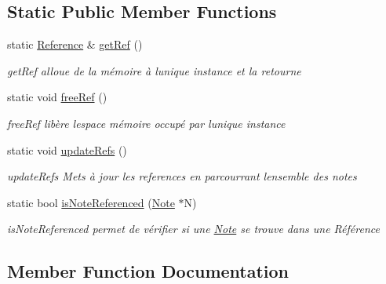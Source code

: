 \subsection*{Static Public Member Functions}
\begin{DoxyCompactItemize}
\item 
static \hyperlink{classReference}{Reference} \& \hyperlink{classReference_a0a885183c4a9c26de166f6e3339786ba}{get\+Ref} ()
\begin{DoxyCompactList}\small\item\em get\+Ref alloue de la mémoire à l\textquotesingle{}unique instance et la retourne \end{DoxyCompactList}\item 
\mbox{\label{classReference_a7544ea6ad6e62ad784d65cddb91d29c3}} 
static void \hyperlink{classReference_a7544ea6ad6e62ad784d65cddb91d29c3}{free\+Ref} ()
\begin{DoxyCompactList}\small\item\em free\+Ref libère l\textquotesingle{}espace mémoire occupé par l\textquotesingle{}unique instance \end{DoxyCompactList}\item 
\mbox{\label{classReference_ae48d8e71f277df20aaa1d6db617b362f}} 
static void \hyperlink{classReference_ae48d8e71f277df20aaa1d6db617b362f}{update\+Refs} ()
\begin{DoxyCompactList}\small\item\em update\+Refs Mets à jour les references en parcourrant l\textquotesingle{}ensemble des notes \end{DoxyCompactList}\item 
static bool \hyperlink{classReference_a591e94c8fc4526305181b563867b85d1}{is\+Note\+Referenced} (\hyperlink{classNote}{Note} $\ast$N)
\begin{DoxyCompactList}\small\item\em is\+Note\+Referenced permet de vérifier si une \hyperlink{classNote}{Note} se trouve dans une Référence \end{DoxyCompactList}\end{DoxyCompactItemize}


\subsection{Member Function Documentation}
\mbox{\label{classReference_a0a885183c4a9c26de166f6e3339786ba}} 
